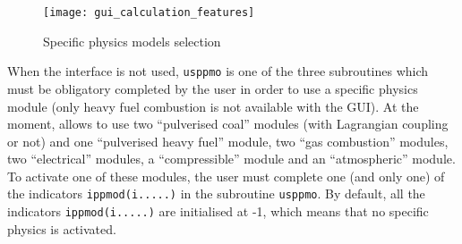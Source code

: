 {{{\begin{figure}[!ht]
\begin{center}
\texttt{[image: gui\_calculation\_features]}
\caption{Specific physics models selection}
\label{fig:5_GUI}
\end{center}
\end{figure}

When the interface is not used, \texttt{usppmo} is one of the three subroutines
which must be obligatory completed by the user in order to use a specific physics module
(only heavy fuel combustion is not available with the GUI).
At the moment, \CS allows to use two ``pulverised coal'' modules
(with Lagrangian coupling or not) and one ``pulverised heavy fuel'' module,
two ``gas combustion'' modules, two ``electrical'' modules,
a ``compressible'' module and an ``atmospheric'' module. To activate one of
these modules, the user must complete one (and only one) of the
indicators \texttt{ippmod(i.....)} in the subroutine
\texttt{usppmo}. By default, all the indicators \texttt{ippmod(i.....)} are
initialised at -1, which means that no specific physics is activated.

}}}
